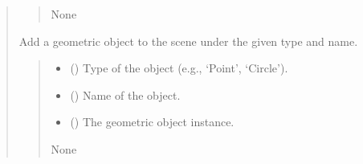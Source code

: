 \documentclass[letterpaper,10pt,english]{sphinxmanual}
\begin{document}
\begin{quote}
\begin{fulllineitems}
\begin{fulllineitems}
\begin{quote}
\begin{description}
\begin{itemize}
\end{itemize}

\sphinxAtStartPar
None

\end{description}\end{quote}

\end{fulllineitems}


\begin{fulllineitems}
\label{\detokenize{pygeox:pygeox.geoscene.GeoScene.add_object}}
\pysigstartsignatures
\pysiglinewithargsret
{}
{\sphinxparamcomma {}\sphinxparamcomma {}}
{}
\pysigstopsignatures
\sphinxAtStartPar
Add a geometric object to the scene under the given type and name.
\begin{quote}\begin{description}
\begin{itemize}
\item {} 
\sphinxAtStartPar
{} () \textendash{} Type of the object (e.g., ‘Point’, ‘Circle’).

\item {} 
\sphinxAtStartPar
{} () \textendash{} Name of the object.

\item {} 
\sphinxAtStartPar
{} () \textendash{} The geometric object instance.

\end{itemize}

\sphinxAtStartPar
None

\end{description}\end{quote}

\end{fulllineitems}



\end{fulllineitems}
\end{quote}
\end{document}
